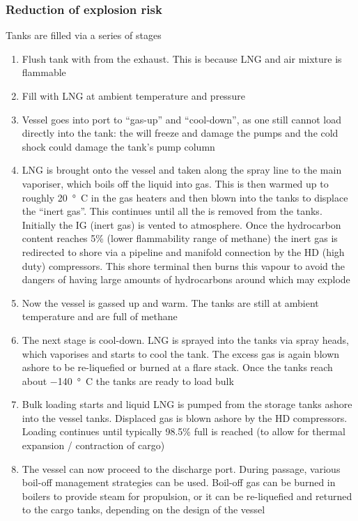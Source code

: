 \subsubsection{Reduction of explosion risk}
Tanks are filled via a series of stages
\begin{enumerate}
    \item Flush tank with  from the exhaust. This is because LNG and air mixture is flammable
    \item Fill with LNG at ambient temperature and pressure
    \item Vessel goes into port to ``gas-up'' and ``cool-down'', as one still cannot load directly into the tank: the  will freeze and damage the pumps and the cold shock could damage the tank's pump column
    \item LNG is brought onto the vessel and taken along the spray line to the main vaporiser, which boils off the liquid into gas. This is then warmed up to roughly \SI{20}{\degree C} in the gas heaters and then blown into the tanks to displace the ``inert gas''. This continues until all the  is removed from the tanks. Initially the IG (inert gas) is vented to atmosphere. Once the hydrocarbon content reaches 5\% (lower flammability range of methane) the inert gas is redirected to shore via a pipeline and manifold connection by the HD (high duty) compressors. This shore terminal then burns this vapour to avoid the dangers of having large amounts of hydrocarbons around which may explode
    \item Now the vessel is gassed up and warm. The tanks are still at ambient temperature and are full of methane
    \item The next stage is cool-down. LNG is sprayed into the tanks via spray heads, which vaporises and starts to cool the tank. The excess gas is again blown ashore to be re-liquefied or burned at a flare stack. Once the tanks reach about \SI{-140}{\degree C} the tanks are ready to load bulk
    \item Bulk loading starts and liquid LNG is pumped from the storage tanks ashore into the vessel tanks. Displaced gas is blown ashore by the HD compressors. Loading continues until typically 98.5\% full is reached (to allow for thermal expansion / contraction of cargo)
    \item The vessel can now proceed to the discharge port. During passage, various boil-off management strategies can be used. Boil-off gas can be burned in boilers to provide steam for propulsion, or it can be re-liquefied and returned to the cargo tanks, depending on the design of the vessel
\end{enumerate}
